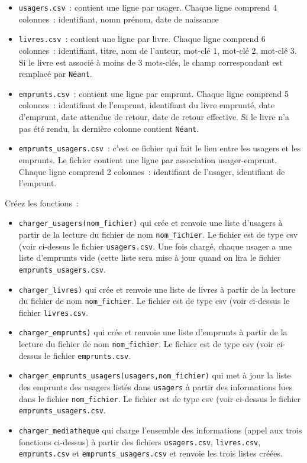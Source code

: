 \documentclass[10pt,a4paper,onecolumn]{article}
\begin{document}
\begin{itemize}
\item \texttt{usagers.csv}~: contient une ligne par usager. Chaque ligne comprend 4 colonnes~: identifiant, nomn prénom, date de naissance
\item \texttt{livres.csv}~: contient une ligne par livre. Chaque ligne comprend 6 colonnes~: identifiant, titre, nom de l'auteur, mot-clé 1, mot-clé 2, mot-clé 3. Si le livre est associé à moins de 3 mots-clés, le champ correspondant est remplacé par \texttt{Néant}.
\item \texttt{emprunts.csv}~: contient une ligne par emprunt. Chaque ligne comprend 5 colonnes~: identifiant de l'emprunt, identifiant du livre emprunté, date d'emprunt, date attendue de retour, date de retour effective. Si le livre n'a pas été rendu, la dernière colonne contient \texttt{Néant}. 
\item \texttt{emprunts\_usagers.csv}~: c'est ce fichier qui fait le lien entre les usagers et les emprunts. Le fichier contient une ligne par association usager-emprunt. Chaque ligne comprend 2 colonnes~: identifiant de l'usager, identifiant de l'emprunt.
\end{itemize}

Créez les fonctions~:

\begin{itemize}
\item \texttt{charger\_usagers(nom\_fichier)} qui crée et renvoie une liste d'usagers à partir de la lecture du fichier de nom \texttt{nom\_fichier}. Le fichier est de type csv (voir ci-dessus le fichier \texttt{usagers.csv}. Une fois chargé, chaque usager a une liste d'emprunts vide (cette liste sera mise à jour quand on lira le fichier \texttt{emprunts\_usagers.csv}.

\item \texttt{charger\_livres)} qui crée et renvoie une liste de livres à partir de la lecture du fichier de nom \texttt{nom\_fichier}. Le fichier est de type csv (voir ci-dessus le fichier \texttt{livres.csv}.

\item \texttt{charger\_emprunts)} qui crée et renvoie une liste d'emprunts à partir de la lecture du fichier de nom \texttt{nom\_fichier}. Le fichier est de type csv (voir ci-dessus le fichier \texttt{emprunts.csv}.

\item \texttt{charger\_emprunts\_usagers(usagers,nom\_fichier)} qui met à jour la liste des emprunts des usagers listés dans \texttt{usagers} à partir des informations lues dans le fichier \texttt{nom\_fichier}. Le fichier est de type csv (voir ci-dessus le fichier \texttt{emprunts\_usagers.csv}.

\item \texttt{charger\_mediatheque} qui charge l'ensemble des informations (appel aux trois fonctions ci-dessus) à partir des fichiers \texttt{usagers.csv}, \texttt{livres.csv}, \texttt{emprunts.csv} et \texttt{emprunts\_usagers.csv} et renvoie les trois listes créées.

\end{itemize}
\end{document}
